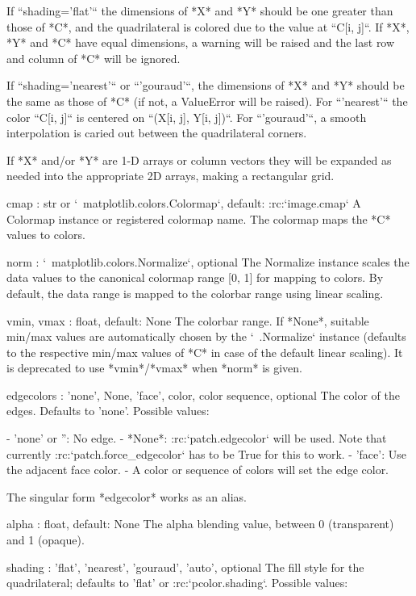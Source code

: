 \begin{DoxyVerb}
\begin{DoxyVerb}
    If ``shading='flat'`` the dimensions of *X* and *Y* should be one
    greater than those of *C*, and the quadrilateral is colored due
    to the value at ``C[i, j]``.  If *X*, *Y* and *C* have equal
    dimensions, a warning will be raised and the last row and column
    of *C* will be ignored.

    If ``shading='nearest'`` or ``'gouraud'``, the dimensions of *X*
    and *Y* should be the same as those of *C* (if not, a ValueError
    will be raised).  For ``'nearest'`` the color ``C[i, j]`` is
    centered on ``(X[i, j], Y[i, j])``.  For ``'gouraud'``, a smooth
    interpolation is caried out between the quadrilateral corners.

    If *X* and/or *Y* are 1-D arrays or column vectors they will be
    expanded as needed into the appropriate 2D arrays, making a
    rectangular grid.

cmap : str or `~matplotlib.colors.Colormap`, default: :rc:`image.cmap`
    A Colormap instance or registered colormap name. The colormap
    maps the *C* values to colors.

norm : `~matplotlib.colors.Normalize`, optional
    The Normalize instance scales the data values to the canonical
    colormap range [0, 1] for mapping to colors. By default, the data
    range is mapped to the colorbar range using linear scaling.

vmin, vmax : float, default: None
    The colorbar range. If *None*, suitable min/max values are
    automatically chosen by the `~.Normalize` instance (defaults to
    the respective min/max values of *C* in case of the default linear
    scaling).
    It is deprecated to use *vmin*/*vmax* when *norm* is given.

edgecolors : {'none', None, 'face', color, color sequence}, optional
    The color of the edges. Defaults to 'none'. Possible values:

    - 'none' or '': No edge.
    - *None*: :rc:`patch.edgecolor` will be used. Note that currently
      :rc:`patch.force_edgecolor` has to be True for this to work.
    - 'face': Use the adjacent face color.
    - A color or sequence of colors will set the edge color.

    The singular form *edgecolor* works as an alias.

alpha : float, default: None
    The alpha blending value, between 0 (transparent) and 1 (opaque).

shading : {'flat', 'nearest', 'gouraud', 'auto'}, optional
    The fill style for the quadrilateral; defaults to
    'flat' or :rc:`pcolor.shading`. Possible values:


\end{DoxyVerb}
\end{DoxyVerb}
